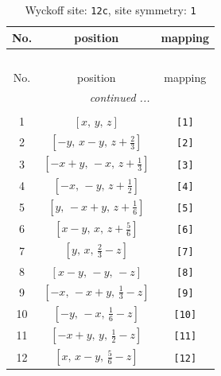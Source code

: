 \documentclass[fleqn,8pt]{jsarticle}
\begin{document}
\begin{longtable}{ccc}
\caption{Wyckoff site: {\tt 12c}, site symmetry: {\tt 1}}
 \\
 \hline \hline
No. & position & mapping \\ \hline \endfirsthead

\multicolumn{2}{l}{\tablename\ \thetable{}} \\
 \hline \hline
No. & position & mapping \\ \hline \endhead

 \hline \hline
\multicolumn{2}{r}{\footnotesize\it continued ...} \\ \endfoot

 \hline \hline
\multicolumn{2}{r}{} \\ \endlastfoot

1 & $\left[ x,\, y,\, z \right]$ & {\tt [1]} \\ \hline
2 & $\left[ - y,\, x - y,\, z + \frac{2}{3} \right]$ & {\tt [2]} \\ \hline
3 & $\left[ - x + y,\, - x,\, z + \frac{1}{3} \right]$ & {\tt [3]} \\ \hline
4 & $\left[ - x,\, - y,\, z + \frac{1}{2} \right]$ & {\tt [4]} \\ \hline
5 & $\left[ y,\, - x + y,\, z + \frac{1}{6} \right]$ & {\tt [5]} \\ \hline
6 & $\left[ x - y,\, x,\, z + \frac{5}{6} \right]$ & {\tt [6]} \\ \hline
7 & $\left[ y,\, x,\, \frac{2}{3} - z \right]$ & {\tt [7]} \\ \hline
8 & $\left[ x - y,\, - y,\, - z \right]$ & {\tt [8]} \\ \hline
9 & $\left[ - x,\, - x + y,\, \frac{1}{3} - z \right]$ & {\tt [9]} \\ \hline
10 & $\left[ - y,\, - x,\, \frac{1}{6} - z \right]$ & {\tt [10]} \\ \hline
11 & $\left[ - x + y,\, y,\, \frac{1}{2} - z \right]$ & {\tt [11]} \\ \hline
12 & $\left[ x,\, x - y,\, \frac{5}{6} - z \right]$ & {\tt [12]} \\
\end{longtable}
\end{document}
